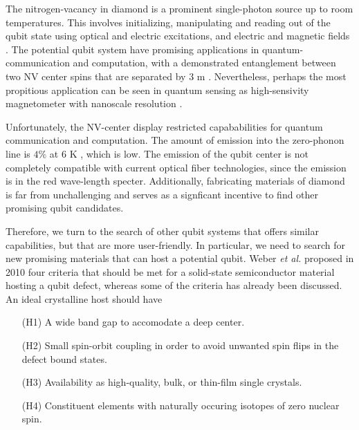 \clearpage

\clearpage

The nitrogen-vacancy in diamond is a prominent single-photon source up to room temperatures. This involves initializing, manipulating and reading out of the qubit state using optical and electric excitations, and electric and magnetic fields \cite{Gordon2013}. The potential qubit system have promising applications in quantum- communication and computation, with a demonstrated entanglement between two NV center spins that are separated by $3$ m \cite{Bernien2013}. Nevertheless, perhaps the most propitious application can be seen in quantum sensing as high-sensivity magnetometer with nanoscale resolution \cite{Taylor2008}.

Unfortunately, the NV-center display restricted capababilities for quantum communication and computation. The amount of emission into the zero-phonon line is $4 \%$ at $6$ K \cite{Barclay2011}, which is low. The emission of the qubit center is not completely compatible with current optical fiber technologies, since the emission is in the red wave-length specter. Additionally, fabricating materials of diamond is far from unchallenging and serves as a signficant incentive to find other promising qubit candidates.

Therefore, we turn to the search of other qubit systems that offers similar capabilities, but that are more user-friendly. In particular, we need to search for new promising materials that can host a potential qubit. Weber \textit{et al.} \cite{Weber2010} proposed in 2010 four criteria that should be met for a solid-state semiconductor material hosting a qubit defect, whereas some of the criteria has already been discussed. An ideal crystalline host should have \cite{Weber2010}
\begin{itemize}
  \item[(H1)] A wide band gap to accomodate a deep center.
  \item[(H2)] Small spin-orbit coupling in order to avoid unwanted spin flips in the defect bound states.
  \item[(H3)] Availability as high-quality, bulk, or thin-film single crystals.
  \item[(H4)] Constituent elements with naturally occuring isotopes of zero nuclear spin.
\end{itemize}



